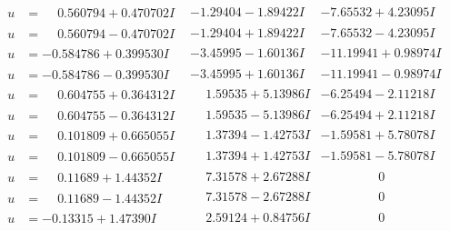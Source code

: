 \documentclass[1p]{elsarticle_modified}
\theoremstyle{definition}
\begin{document}
$$\begin{array}{c|c|c}
\begin{aligned}
u &= \phantom{-}0.560794 + 0.470702 I\end{aligned}
 & -1.29404 - 1.89422 I & -7.65532 + 4.23095 I \\ \hline\begin{aligned}
u &= \phantom{-}0.560794 - 0.470702 I\end{aligned}
 & -1.29404 + 1.89422 I & -7.65532 - 4.23095 I \\ \hline\begin{aligned}
u &= -0.584786 + 0.399530 I\end{aligned}
 & -3.45995 - 1.60136 I & -11.19941 + 0.98974 I \\ \hline\begin{aligned}
u &= -0.584786 - 0.399530 I\end{aligned}
 & -3.45995 + 1.60136 I & -11.19941 - 0.98974 I \\ \hline\begin{aligned}
u &= \phantom{-}0.604755 + 0.364312 I\end{aligned}
 & \phantom{-}1.59535 + 5.13986 I & -6.25494 - 2.11218 I \\ \hline\begin{aligned}
u &= \phantom{-}0.604755 - 0.364312 I\end{aligned}
 & \phantom{-}1.59535 - 5.13986 I & -6.25494 + 2.11218 I \\ \hline\begin{aligned}
u &= \phantom{-}0.101809 + 0.665055 I\end{aligned}
 & \phantom{-}1.37394 - 1.42753 I & -1.59581 + 5.78078 I \\ \hline\begin{aligned}
u &= \phantom{-}0.101809 - 0.665055 I\end{aligned}
 & \phantom{-}1.37394 + 1.42753 I & -1.59581 - 5.78078 I \\ \hline\begin{aligned}
u &= \phantom{-}0.11689 + 1.44352 I\end{aligned}
 & \phantom{-}7.31578 + 2.67288 I & \phantom{-0.000000 } 0 \\ \hline\begin{aligned}
u &= \phantom{-}0.11689 - 1.44352 I\end{aligned}
 & \phantom{-}7.31578 - 2.67288 I & \phantom{-0.000000 } 0 \\ \hline\begin{aligned}
u &= -0.13315 + 1.47390 I\end{aligned}
 & \phantom{-}2.59124 + 0.84756 I & \phantom{-0.000000 } 0 \\ \hline\begin{aligned}

\end{aligned}
\end{array}$$
\end{document}
